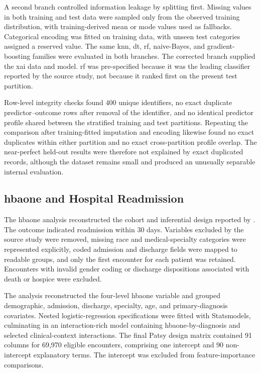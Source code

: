 A second branch controlled information leakage by splitting first. Missing values in both training and test data were sampled only from the observed training distribution, with training-derived mean or mode values used as fallbacks. Categorical encoding was fitted on training data, with unseen test categories assigned a reserved value. The same \gls{knn}, \gls{dt}, \gls{rf}, naive-Bayes, and gradient-boosting families were evaluated in both branches. The corrected branch supplied the \gls{xai} data and model. \Gls{rf} was pre-specified because it was the leading classifier reported by the source study, not because it ranked first on the present test partition.

Row-level integrity checks found 400 unique identifiers, no exact duplicate predictor--outcome rows after removal of the identifier, and no identical predictor profile shared between the stratified training and test partitions. Repeating the comparison after training-fitted imputation and encoding likewise found no exact duplicates within either partition and no exact cross-partition profile overlap. The near-perfect held-out results were therefore not explained by exact duplicated records, although the dataset remains small and produced an unusually separable internal evaluation.

\subsection{\gls{hbaone} and Hospital Readmission}

The \gls{hbaone} analysis reconstructed the cohort and inferential design reported by \citet{strack_impact_2014}. The outcome indicated readmission within 30 days. Variables excluded by the source study were removed, missing race and medical-specialty categories were represented explicitly, coded admission and discharge fields were mapped to readable groups, and only the first encounter for each patient was retained. Encounters with invalid gender coding or discharge dispositions associated with death or hospice were excluded.

The analysis reconstructed the four-level \gls{hbaone} variable and grouped demographic, admission, discharge, specialty, age, and primary-diagnosis covariates. Nested logistic-regression specifications were fitted with Statsmodels, culminating in an interaction-rich model containing \gls{hbaone}-by-diagnosis and selected clinical-context interactions. The final Patsy design matrix contained 91 columns for 69,970 eligible encounters, comprising one intercept and 90 non-intercept explanatory terms. The intercept was excluded from feature-importance comparisons.

